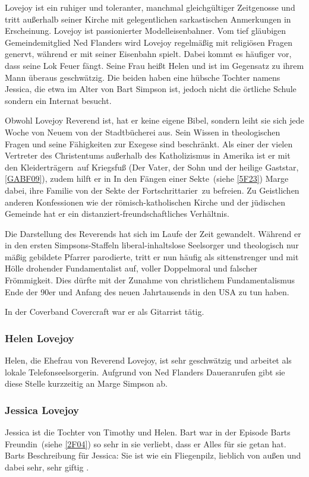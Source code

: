 {Lovejoy ist ein ruhiger und toleranter, manchmal gleichgültiger Zeitgenosse und tritt außerhalb seiner Kirche mit gelegentlichen sarkastischen Anmerkungen in Erscheinung. Lovejoy ist passionierter Modelleisenbahner. Vom tief gläubigen Gemeindemitglied Ned Flanders wird Lovejoy regelmäßig mit religiösen Fragen genervt, während er mit seiner Eisenbahn spielt. Dabei kommt es häufiger vor, dass seine Lok Feuer fängt. Seine Frau heißt Helen und ist im Gegensatz zu ihrem Mann überaus geschwätzig. Die beiden haben eine hübsche Tochter namens Jessica, die etwa im Alter von Bart Simpson ist, jedoch nicht die örtliche Schule sondern ein Internat besucht.

Obwohl Lovejoy Reverend ist, hat er keine eigene Bibel, sondern leiht sie sich jede Woche von Neuem von der Stadtbücherei aus. Sein Wissen in theologischen Fragen und seine Fähigkeiten zur Exegese sind beschränkt. Als einer der vielen Vertreter des Christentums außerhalb des Katholizismus in Amerika ist er mit den \glqq Kleiderträgern\grqq\ auf Kriegsfuß (\glqq Der Vater, der Sohn und der heilige Gaststar\grqq, \ref{GABF09}), zudem hilft er in \glqq In den Fängen einer Sekte\grqq\ (siehe \ref{5F23}) Marge dabei, ihre Familie von der Sekte der \glqq Fortschrittarier\grqq\ zu befreien. Zu Geistlichen anderen Konfessionen wie der römisch-katholischen Kirche und der jüdischen Gemeinde hat er ein distanziert-freundschaftliches Verhältnis.

Die Darstellung des Reverends hat sich im Laufe der Zeit gewandelt. Während er in den ersten Simpsons-Staffeln liberal-inhaltslose Seelsorger und theologisch nur mäßig gebildete Pfarrer parodierte, tritt er nun häufig als sittenstrenger und mit Hölle drohender Fundamentalist auf, voller Doppelmoral und falscher Frömmigkeit. Dies dürfte mit der Zunahme von christlichem Fundamentalismus Ende der 90er und Anfang des neuen Jahrtausends in den USA zu tun haben.

In der Coverband Covercraft war er als Gitarrist tätig.

\subsubsection{Helen Lovejoy}
Helen, die Ehefrau von Reverend Lovejoy, ist sehr geschwätzig und arbeitet als lokale Telefonseelsorgerin. Aufgrund von Ned Flanders Daueranrufen gibt sie diese Stelle kurzzeitig an Marge Simpson ab.

\subsubsection{Jessica Lovejoy}
Jessica ist die Tochter von Timothy und Helen. Bart war in der Episode \glqq Barts Freundin\grqq\ (siehe \ref{2F04}) so sehr in sie verliebt, dass er Alles für sie getan hat. Barts Beschreibung für Jessica: Sie ist wie ein Fliegenpilz, lieblich von außen und dabei sehr, sehr giftig \cite{SpringfieldAt}.
 
}
